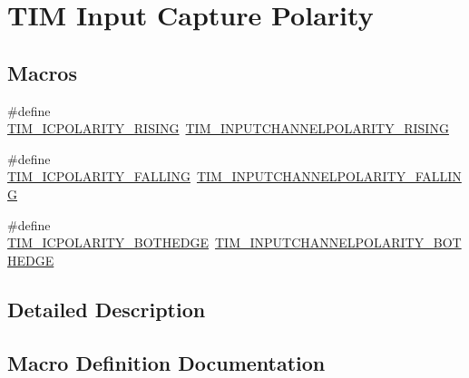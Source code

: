 \hypertarget{group___t_i_m___input___capture___polarity}{}\section{T\+IM Input Capture Polarity}
\label{group___t_i_m___input___capture___polarity}
\subsection*{Macros}
\begin{DoxyCompactItemize}
\item 
\#define \mbox{\hyperlink{group___t_i_m___input___capture___polarity_gac79dd2a7ba97e5aac0bb9cbdc2d02ee1}{T\+I\+M\+\_\+\+I\+C\+P\+O\+L\+A\+R\+I\+T\+Y\+\_\+\+R\+I\+S\+I\+NG}}~\mbox{\hyperlink{group___t_i_m___input___channel___polarity_ga4f4cede88a4ad4b33e81f2567e9bb08f}{T\+I\+M\+\_\+\+I\+N\+P\+U\+T\+C\+H\+A\+N\+N\+E\+L\+P\+O\+L\+A\+R\+I\+T\+Y\+\_\+\+R\+I\+S\+I\+NG}}
\item 
\#define \mbox{\hyperlink{group___t_i_m___input___capture___polarity_gaec0c00d0b749e8c18101cefcce7c32f6}{T\+I\+M\+\_\+\+I\+C\+P\+O\+L\+A\+R\+I\+T\+Y\+\_\+\+F\+A\+L\+L\+I\+NG}}~\mbox{\hyperlink{group___t_i_m___input___channel___polarity_ga07441a8c0a52234e30f471c23803450c}{T\+I\+M\+\_\+\+I\+N\+P\+U\+T\+C\+H\+A\+N\+N\+E\+L\+P\+O\+L\+A\+R\+I\+T\+Y\+\_\+\+F\+A\+L\+L\+I\+NG}}
\item 
\#define \mbox{\hyperlink{group___t_i_m___input___capture___polarity_ga7a340c94a7bd0fa4a915afa8788e0b71}{T\+I\+M\+\_\+\+I\+C\+P\+O\+L\+A\+R\+I\+T\+Y\+\_\+\+B\+O\+T\+H\+E\+D\+GE}}~\mbox{\hyperlink{group___t_i_m___input___channel___polarity_gaab2598881d1f19158e77723c5d29d6ac}{T\+I\+M\+\_\+\+I\+N\+P\+U\+T\+C\+H\+A\+N\+N\+E\+L\+P\+O\+L\+A\+R\+I\+T\+Y\+\_\+\+B\+O\+T\+H\+E\+D\+GE}}
\end{DoxyCompactItemize}


\subsection{Detailed Description}


\subsection{Macro Definition Documentation}
\mbox{\label{group___t_i_m___input___capture___polarity_ga7a340c94a7bd0fa4a915afa8788e0b71}} 
